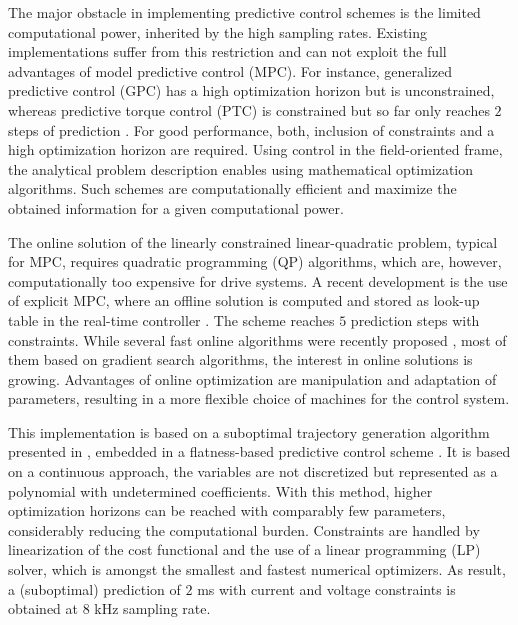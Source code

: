 \documentclass[a4paper,11pt,fleqn]{article}
\begin{document}
The major obstacle in implementing predictive control schemes is the limited computational power, inherited by the high sampling rates. Existing implementations suffer from this restriction and can not exploit the full advantages of model predictive control (MPC). For instance, generalized predictive control (GPC) has a high optimization horizon but is unconstrained, whereas predictive torque control (PTC) is constrained but so far only reaches $2$ steps of prediction \cite{Cortes}. For good performance, both, inclusion of constraints and a high optimization horizon are required. Using control in the field-oriented frame, the analytical problem description enables using mathematical optimization algorithms. Such schemes are computationally efficient and maximize the obtained information for a given computational power. 

The online solution of the linearly constrained linear-quadratic problem, typical for MPC, requires quadratic programming (QP) algorithms, which are, however, computationally too expensive for drive systems. A recent development is the use of explicit MPC, where an offline solution is computed and stored as look-up table in the real-time controller \cite{Kuehl} \cite{inhFW}. The scheme reaches $5$ prediction steps with constraints. While several fast online algorithms were recently proposed \cite{Kouvaritakis} \cite{onlineMPC}, most of them based on gradient search algorithms, the interest in online solutions is growing. Advantages of online optimization are manipulation and adaptation of parameters, resulting in a more flexible choice of machines for the control system.

This implementation is based on a suboptimal trajectory generation algorithm presented in \cite{SK10}, embedded in a flatness-based predictive control scheme \cite{Fliess}. It is based on a continuous approach, the variables are not discretized but represented as a polynomial with undetermined coefficients. With this method, higher optimization horizons can be reached with comparably few parameters, considerably reducing the computational burden. Constraints are handled by linearization of the cost functional and the use of a linear programming (LP) solver, which is amongst the smallest and fastest numerical optimizers. As result, a (suboptimal) prediction of $2$ ms with current and voltage constraints is obtained at $8$ kHz sampling rate.
\end{document}
